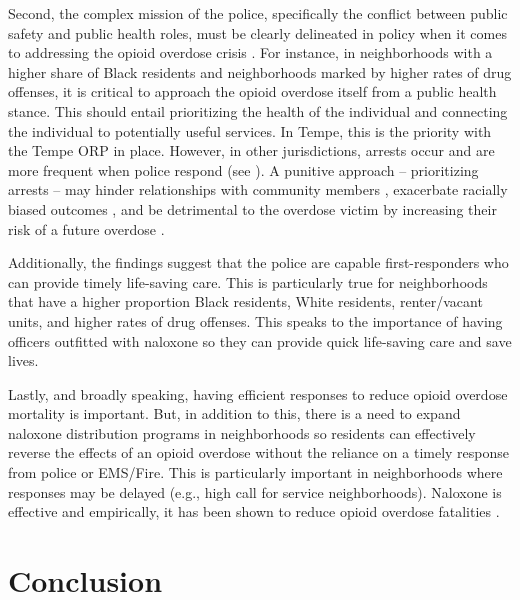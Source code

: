 Second, the complex mission of the police, specifically the conflict between public safety and public health roles, must be clearly delineated in policy when it comes to addressing the opioid overdose crisis \parencite{del_pozo_beyond_2021}. For instance, in neighborhoods with a higher share of Black residents and neighborhoods marked by higher rates of drug offenses, it is critical to approach the opioid overdose itself from a public health stance. This should entail prioritizing the health of the individual and connecting the individual to potentially useful services. In Tempe, this is the priority with the Tempe ORP in place. However, in other jurisdictions, arrests occur and are more frequent when police respond (see \cite{lowder_twoyear_2020}). A punitive approach -- prioritizing arrests -- may hinder relationships with community members \parencite{van_der_meulen_thats_2021}, exacerbate racially biased outcomes \parencite{kochel_effect_2011}, and be detrimental to the overdose victim by increasing their risk of a future overdose \parencite{binswanger_clinical_2016, ray_spatiotemporal_2023}. 

Additionally, the findings suggest that the police are capable first-responders who can provide timely life-saving care. This is particularly true for neighborhoods that have a higher proportion Black residents, White residents, renter/vacant units, and higher rates of drug offenses. This speaks to the importance of having officers outfitted with naloxone so they can provide quick life-saving care and save lives. 

Lastly, and broadly speaking, having efficient responses to reduce opioid overdose mortality is important. But, in addition to this, there is a need to expand naloxone distribution programs in neighborhoods so residents can effectively reverse the effects of an opioid overdose without the reliance on a timely response from police or EMS/Fire. This is particularly important in neighborhoods where responses may be delayed (e.g., high call for service neighborhoods). Naloxone is effective and empirically, it has been shown to reduce opioid overdose fatalities \parencite{mcclellan_opioid-overdose_2018, rees_little_2019}. 

\section{\centering Conclusion}


